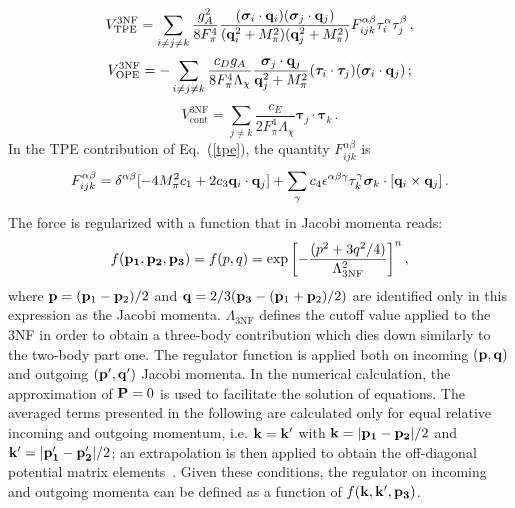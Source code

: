 \begin{equation}
V^\mathrm{3NF}_\mathrm{TPE} =\sum_{i\neq j\neq k}  \frac{g_A^2}{8F_\pi^4}
\frac{(\boldsymbol\sigma_i\cdot{\bf q}_i)(\boldsymbol\sigma_j\cdot{\bf q}_j)}{({\bf q}_i^2 + M_\pi^2)
({\bf q}_j^2 + M_\pi^2)}
F_{ijk}^{\alpha\beta}\tau_i^{\alpha}\tau_j^{\beta}\,,
\label{tpe}
\end{equation}
\begin{equation}
V^\mathrm{3NF}_\mathrm{OPE} = -\sum_{i\neq j\neq k} \frac{c_D g_A}{8F_\pi^4\Lambda_\chi}
\frac{\boldsymbol\sigma_j\cdot{\bf q}_j}{{\bf q}_j^2 + M_\pi^2}(\boldsymbol\tau_i\cdot\boldsymbol\tau_j)
(\boldsymbol\sigma_i\cdot{\bf q}_j)\,;
\label{ope}
\end{equation}
\begin{equation}
V^\mathrm{3NF}_\mathrm{cont} =  \sum_{j\neq k} \frac{c_E}{2F_\pi^4\Lambda_\chi}
\boldsymbol\tau_j \cdot \boldsymbol\tau_k \,.
\label{cont}
\end{equation}
In the TPE contribution of Eq.~(\ref{tpe}), the quantity $F_{ijk}^{\alpha\beta}$ is
\begin{equation}
F_{ijk}^{\alpha\beta}=\delta^{\alpha\beta} [-4M_\pi^2c_1+2 c_3{\bf q}_i\cdot{\bf q}_j]
+\sum_\gamma c_4\epsilon^{\alpha\beta\gamma}\tau^\gamma_k\boldsymbol\sigma_k\cdot[{\bf q}_i\times{\bf q}_j]\,.
\label{tpe_tensor}
\end{equation}
The force is regularized with a function that in Jacobi momenta reads:
\begin{equation}
f({\bf p_1},{\bf p_2},{\bf p_3})=f(p,q)=\exp{\left[-\frac{(p^2+3q^2/4)}{\Lambda^2_\textrm{3NF}}\right]^n}\,,
\end{equation}
where ${\bf p}=({\bf p}_1-{\bf p}_2)/2$ and ${\bf q}=2/3({\bf p_3}-({\bf p}_1+{\bf p}_2)/2)$ are identified only in this expression as the Jacobi momenta. $\Lambda_\textrm{3NF}$ defines the cutoff value applied to the 3NF in order to obtain a three-body contribution which dies down similarly to the two-body part one. The regulator function is applied both on incoming $({\bf p},{\bf q})$ and outgoing $({\bf p'},{\bf q'})$ Jacobi momenta. In the numerical calculation, the approximation of ${\bf P}=0$ is used to facilitate the solution of equations. The averaged terms presented in the following are calculated only for equal relative incoming and outgoing momentum, i.e. ${\bf k}={\bf k'}$ with ${\bf k}=|{\bf p_1}-{\bf p_2}|/2$ and ${\bf k'}=|{\bf p'_1}-{\bf p'_2}|/2$; an extrapolation is then applied to obtain the off-diagonal potential matrix elements~\cite{Carbone2014}. Given these conditions, the regulator on incoming and outgoing momenta can be defined as a function of $f({\bf k},{\bf k'},{\bf p_3})$.\\

